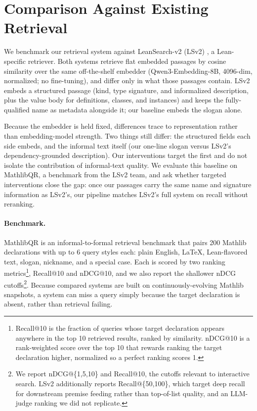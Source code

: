 
\section{Comparison Against Existing Retrieval}
\label{sec:exp4_lsv2}

We benchmark our retrieval system against LeanSearch-v2 (LSv2) \citep{leansearch-v2}, a Lean-specific retriever. Both systems retrieve flat embedded passages by cosine similarity over the same off-the-shelf embedder (Qwen3-Embedding-8B, 4096-dim, normalized; no fine-tuning), and differ only in what those passages contain. LSv2 embeds a structured passage (kind, type signature, and informalized description, plus the value body for definitions, classes, and instances) and keeps the fully-qualified name as metadata alongside it; our baseline embeds the slogan alone.

Because the embedder is held fixed, differences trace to representation rather than embedding-model strength. Two things still differ: the structured fields each side embeds, and the informal text itself (our one-line slogan versus LSv2's dependency-grounded description). Our interventions target the first and do not isolate the contribution of informal-text quality. We evaluate this baseline on MathlibQR, a benchmark from the LSv2 team, and ask whether targeted interventions close the gap: once our passages carry the same name and signature information as LSv2's, our pipeline matches LSv2's full system on recall without reranking.

\paragraph{Benchmark.}
MathlibQR is an informal-to-formal retrieval benchmark that pairs 200 Mathlib declarations with up to 6 query styles each: plain English, \LaTeX{}, Lean-flavored text, slogan, nickname, and a special case. Each is scored by two ranking metrics\footnote{Recall@10 is the fraction of queries whose target declaration appears anywhere in the top 10 retrieved results, ranked by similarity. nDCG@10 is a rank-weighted score over the top 10 that rewards ranking the target declaration higher, normalized so a perfect ranking scores 1.}, Recall@10 and nDCG@10, and we also report the shallower nDCG cutoffs\footnote{We report nDCG@\{1,5,10\} and Recall@10, the cutoffs relevant to interactive search. LSv2 additionally reports Recall@\{50,100\}, which target deep recall for downstream premise feeding rather than top-of-list quality, and an LLM-judge ranking we did not replicate.}.  Because compared systems are built on continuously-evolving Mathlib snapshots, a system can miss a query simply because the target declaration is absent, rather than retrieval failing.

